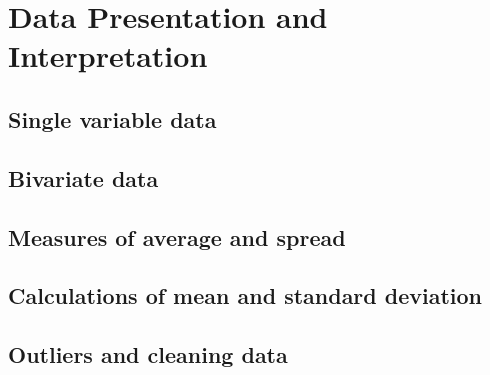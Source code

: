 
\chapter{Data Presentation and Interpretation}

\section{Single variable data}
\section{Bivariate data}
\section{Measures of average and spread}
\section{Calculations of mean and standard deviation}
\section{Outliers and cleaning data}
